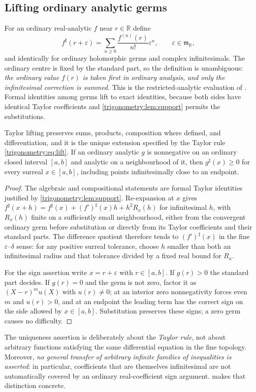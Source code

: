 \documentclass[11pt,letterpaper]{article}
\numberwithin{equation}{section}
\theoremstyle{definition}
\theoremstyle{remark}
\newcommand{\R}{\mathbb R}
\newcommand{\mm}{\mathfrak m}
\newcommand{\eps}{\varepsilon}
\newcommand{\sh}{^{\sharp}}
\begin{document}
\subsection{Lifting ordinary analytic germs}
For an ordinary real-analytic $f$ near $r\in\R$ define
\begin{equation}\label{trigonometry:eq:lift}
 f\sh(r+\eps)=\sum_{n\ge0}\frac{f^{(n)}(r)}{n!}\eps^n,\qquad\eps\in\mm_{\R},
\end{equation}
and identically for ordinary holomorphic germs and complex infinitesimals. The ordinary centre is
fixed by the standard part, so the definition is unambiguous: \emph{the ordinary value $f(r)$ is
taken first in ordinary analysis, and only the infinitesimal correction is summed.} This is the
restricted-analytic evaluation of \cite{SourceAnalysis,vdDE}. Formal identities among germs lift
to exact identities, because both sides have identical Taylor coefficients and
\cref{trigonometry:lem:support} permits the substitutions.

\begin{proposition}\label{trigonometry:prop:lift}
Taylor lifting preserves sums, products, composition where defined, and differentiation, and it is
the unique extension specified by the Taylor rule \cref{trigonometry:eq:lift}. If an ordinary
analytic $g$ is nonnegative on an ordinary closed interval $[a,b]$ and analytic on a neighbourhood
of it, then $g\sh(x)\ge0$ for every surreal $x\in[a,b]$, including points infinitesimally close to
an endpoint.
\end{proposition}
\begin{proof}
The algebraic and compositional statements are formal Taylor identities justified by
\cref{trigonometry:lem:support}. Re-expansion at $x$ gives
$f\sh(x+h)=f\sh(x)+(f')\sh(x)h+h^2R_x(h)$ for infinitesimal $h$, with $R_x(h)$ finite on a
sufficiently small neighbourhood, either from the convergent ordinary germ before substitution or
directly from its Taylor coefficients and their standard parts. The difference quotient therefore
tends to $(f')\sh(x)$ in the fine $\eps$--$\delta$ sense: for any positive surreal tolerance,
choose $h$ smaller than both an infinitesimal radius and that tolerance divided by a fixed real
bound for $R_x$.

For the sign assertion write $x=r+\eps$ with $r\in[a,b]$. If $g(r)>0$ the standard part decides.
If $g(r)=0$ and the germ is not zero, factor it as $(X-r)^mu(X)$ with $u(r)\ne0$; at an interior
zero nonnegativity forces even $m$ and $u(r)>0$, and at an endpoint the leading term has the
correct sign on the side allowed by $x\in[a,b]$. Substitution preserves these signs; a zero germ
causes no difficulty.
\end{proof}
The uniqueness assertion is deliberately about the \emph{Taylor rule}, not about arbitrary
functions satisfying the same differential equation in the fine topology. Moreover, \emph{no
general transfer of arbitrary infinite families of inequalities is asserted}: in particular,
coefficients that are themselves infinitesimal are not automatically covered by an ordinary
real-coefficient sign argument.  makes that distinction concrete.
\end{document}

